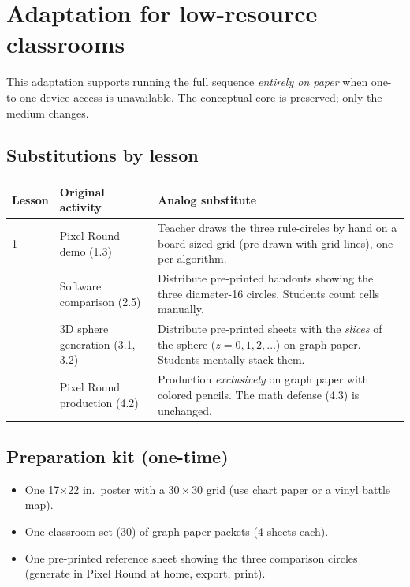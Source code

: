 \documentclass[12pt,letterpaper]{scrartcl}
\begin{document}
\newpage
\section{Adaptation for low-resource classrooms}\label{ap:adapt}

This adaptation supports running the full sequence \emph{entirely on paper} when one-to-one device access is unavailable. The conceptual core is preserved; only the medium changes.

\subsection{Substitutions by lesson}

\begin{center}
\small
\begin{tabularx}{\textwidth}{@{}p{}p{}X@{}}
\toprule
\textbf{Lesson} & \textbf{Original activity} & \textbf{Analog substitute} \\
\midrule
1 & Pixel Round demo (1.3) & Teacher draws the three rule-circles by hand on a board-sized grid (pre-drawn with grid lines), one per algorithm. \\
\addlinespace[3pt]
2 & Software comparison (2.5) & Distribute pre-printed handouts showing the three diameter-16 circles. Students count cells manually. \\
\addlinespace[3pt]
3 & 3D sphere generation (3.1, 3.2) & Distribute pre-printed sheets with the \emph{slices} of the sphere ($z = 0, 1, 2, \ldots$) on graph paper. Students mentally stack them. \\
\addlinespace[3pt]
4 & Pixel Round production (4.2) & Production \emph{exclusively} on graph paper with colored pencils. The math defense (4.3) is unchanged. \\
\bottomrule
\end{tabularx}
\end{center}

\subsection{Preparation kit (one-time)}
\begin{itemize}[leftmargin=1.3em,itemsep=0.1em,topsep=0.2em,nosep]
  \item One 17$\times$22 in.\ poster with a $30 \times 30$ grid (use chart paper or a vinyl battle map).
  \item One classroom set (30) of graph-paper packets (4 sheets each).
  \item One pre-printed reference sheet showing the three comparison circles (generate in Pixel Round at home, export, print).
\end{itemize}
\end{document}
